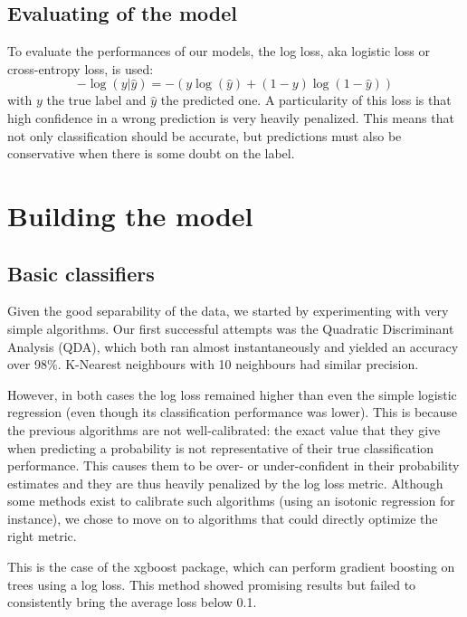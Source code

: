 \documentclass[a4paper,11pt,openany,extrafontsizes,oneside,article]{memoir}
\newcommand{\yTrue}{y}
\newcommand{\yPred}{\hat{y}}
\begin{document}
\section{Evaluating of the model}

To evaluate the performances of our models, the log loss, aka logistic
loss or cross-entropy loss, is used:
\[ -\log(\yTrue | \yPred) = -(\yTrue \log(\yPred) + (1 - \yTrue)
  \log(1 - \yPred))\] with $y$ the true label and $\hat{y}$ the
predicted one. A particularity of this loss is that high confidence in
a wrong prediction is very heavily penalized. This means that not only
classification should be accurate, but predictions must also be
conservative when there is some doubt on the label.


\chapter{Building the model}

\section{Basic classifiers}

Given the good separability of the data, we started by experimenting
with very simple algorithms. Our first successful attempts was the
Quadratic Discriminant Analysis (QDA), which both ran almost
instantaneously and yielded an accuracy over 98\%. K-Nearest
neighbours with 10 neighbours had similar precision.

However, in both cases the log loss remained higher than even the
simple logistic regression (even though its classification performance
was lower). This is because the previous algorithms are not
well-calibrated: the exact value that they give when predicting a
probability is not representative of their true classification
performance. This causes them to be over- or under-confident in their
probability estimates and they are thus heavily penalized by the log
loss metric. Although some methods exist to calibrate such algorithms
(using an isotonic regression for instance), we chose to move on to
algorithms that could directly optimize the right metric.
    
This is the case of the xgboost package, which can perform gradient
boosting on trees using a log loss. This method showed promising
results but failed to consistently bring the average loss below 0.1.
\end{document}
